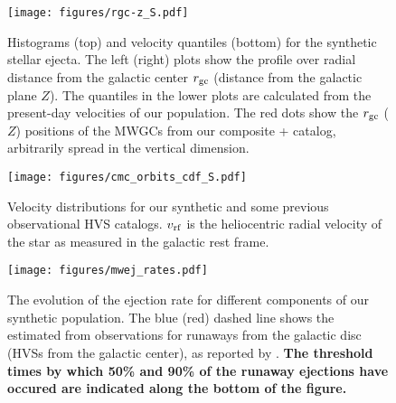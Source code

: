 \documentclass[twocolumn]{aastex631}
\begin{document}
\begin{figure*}
    \begin{centering}
        \texttt{[image: figures/rgc-z\_S.pdf]}
        \caption{
            Histograms (top) and velocity quantiles (bottom) for the synthetic stellar ejecta.
            The left (right) plots show the profile over radial distance from the galactic center $r_{\rm gc}$ (distance from the galactic plane $Z$).
            The quantiles in the lower plots are calculated from the present-day velocities of our population.
            The red dots show the $r_{\rm gc}$ ($Z$) positions of the MWGCs from our composite \citet{2018MNRAS.478.1520B}+\citet{2010arXiv1012.3224H} catalog, arbitrarily spread in the vertical dimension.
        }
        \label{fig:rgc-z}
    \end{centering}
\end{figure*}

\begin{figure}
    \begin{centering}
        \texttt{[image: figures/cmc\_orbits\_cdf\_S.pdf]}
        \caption{
            Velocity distributions for our synthetic and some previous observational HVS catalogs.
            $v_{\rm rf}$ is the heliocentric radial velocity of the star as measured in the galactic rest frame.
        }
        \label{fig:cmc_orbits_cdf}
    \end{centering}
\end{figure}

\begin{figure}
    \begin{centering}
        \texttt{[image: figures/mwej\_rates.pdf]}
        \caption{
            The evolution of the ejection rate for different components of our synthetic population.
            The blue (red) dashed line shows the estimated from observations for runaways from the galactic disc (HVSs from the galactic center), as reported by \citet{2015ARA&A..53...15B}.
            \textbf{The threshold times by which 50\% and 90\% of the runaway ejections have occured are indicated along the bottom of the figure.}
        }
        \label{fig:mwej_rates}
    \end{centering}
\end{figure}
\end{document}
